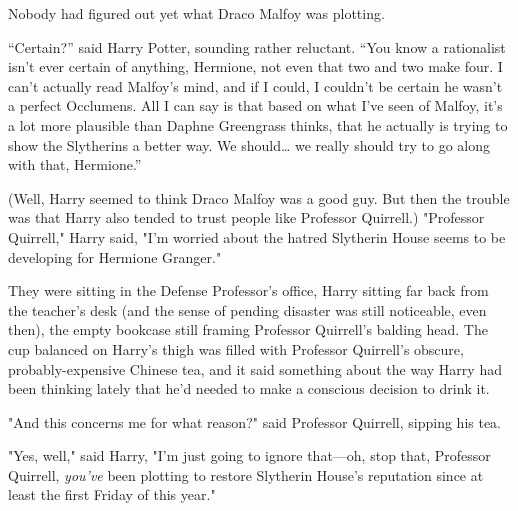 Nobody had figured out yet what Draco Malfoy was plotting.

\begin{em}
``Certain?'' said Harry Potter, sounding rather reluctant. ``You know a 
rationalist isn't ever certain of anything, Hermione, not even that two and two 
make four. I can't actually read Malfoy's mind, and if I could, I couldn't be 
certain he wasn't a perfect Occlumens. All I can say is that based on what I've 
seen of Malfoy, it's a lot more plausible than Daphne Greengrass thinks, that 
he actually is trying to show the Slytherins a better way. We should{\ldots} we 
really should try to go along with that, Hermione.''
\end{em}

(Well, Harry seemed to think Draco Malfoy was a good guy. But then the trouble 
was that Harry also tended to trust people like Professor Quirrell.)
\sbreak
"Professor Quirrell," Harry said, "I'm worried about the hatred Slytherin House 
seems to be developing for Hermione Granger."

They were sitting in the Defense Professor's office, Harry sitting far back 
from the teacher's desk (and the sense of pending disaster was still 
noticeable, even then), the empty bookcase still framing Professor Quirrell's 
balding head. The cup balanced on Harry's thigh was filled with Professor 
Quirrell's obscure, probably-expensive Chinese tea, and it said something about 
the way Harry had been thinking lately that he'd needed to make a conscious 
decision to drink it.

"And this concerns me for what reason?" said Professor Quirrell, sipping his 
tea.

"Yes, well," said Harry, "I'm just going to ignore that---oh, stop that, 
Professor Quirrell, \emph{you've} been plotting to restore Slytherin House's 
reputation since at least the first Friday of this year."

